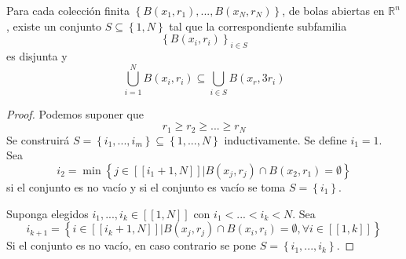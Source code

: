 \documentclass[12pt]{report}
\theoremstyle{largebreak}
\renewcommand{\geq}{\ensuremath{\geqslant}}
\newcommand{\natint}[1]{\ensuremath{\left[\!\left[#1\right]\!\right]}}
\begin{document}
    \begin{lema}
        Para cada colección finita $\left\{B(x_1,r_1),...,B(x_N,r_N) \right\}$, de bolas abiertas en $\mathbb{R}^n$, existe un conjunto $S\subseteq\left\{1,N\right\}$ tal que la correspondiente subfamilia
        \begin{equation*}
            \left\{B(x_i,r_i)\right\}_{ i\in S}
        \end{equation*}
        es disjunta y
        \begin{equation*}
            \bigcup_{ i=1}^N B(x_i,r_i)\subseteq\bigcup_{ i\in S}B(x_r,3r_i)
        \end{equation*}
    \end{lema}

    \begin{proof}
        Podemos suponer que
        \begin{equation*}
            r_1\geq r_2\geq ...\geq r_N
        \end{equation*}
        Se construirá $S=\left\{i_1,...,i_m \right\}\subseteq\left\{1,...,N\right\}$ inductivamente. Se define $i_1=1$. Sea
        \begin{equation*}
            i_2=\min\left\{j\in\natint{i_1+1,N}\Big|B(x_j,r_j)\cap B(x_2, r_1)=\emptyset \right\}
        \end{equation*}
        si el conjunto es no vacío y si el conjunto es vacío se toma $S=\left\{i_1 \right\}$.

        Suponga elegidos $i_1,...,i_k\in\natint{1,N}$ con $i_1<...<i_k<N$. Sea
        \begin{equation*}
            i_{ k+1}=\left\{i\in\natint{i_k+1,N}\Big|B(x_j,r_j)\cap B(x_i,r_i)=\emptyset,\forall i\in\natint{1,k} \right\}
        \end{equation*}
        Si el conjunto es no vacío, en caso contrario se pone $S=\left\{i_1,...,i_k\right\}$.


\end{proof}
\end{document}

